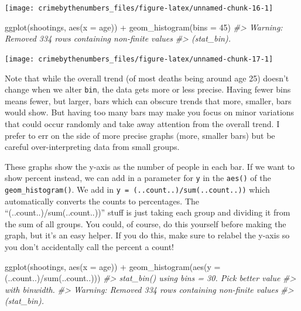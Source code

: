 \documentclass[
]{krantz}
\makeatletter
\newenvironment{Shaded}{\begin{snugshade}}{\end{snugshade}}
\newcommand{\AttributeTok}[1]{\textcolor[rgb]{0.61,0.61,0.61}{#1}}
\newcommand{\CommentTok}[1]{\textcolor[rgb]{0.37,0.37,0.37}{\textit{#1}}}
\newcommand{\DecValTok}[1]{\textcolor[rgb]{0.06,0.06,0.06}{#1}}
\newcommand{\FunctionTok}[1]{\textcolor[rgb]{0,0,0}{#1}}
\newcommand{\NormalTok}[1]{#1}
\newcommand{\SpecialCharTok}[1]{\textcolor[rgb]{0,0,0}{#1}}
\newenvironment{kframe}{%
\medskip{}
\setlength{\fboxsep}{.8em}
 \def\at@end@of@kframe{}%
 \ifinner\ifhmode%
  \def\at@end@of@kframe{\end{minipage}}%
  \begin{minipage}{\columnwidth}%
 \fi\fi%
 \def\FrameCommand##1{\hskip\@totalleftmargin \hskip-\fboxsep
 \colorbox{shadecolor}{##1}\hskip-\fboxsep
     \hskip-\linewidth \hskip-\@totalleftmargin \hskip\columnwidth}%
 \MakeFramed {\advance\hsize-\width
   \@totalleftmargin\z@ \linewidth\hsize
   \@setminipage}}%
 {\par\unskip\endMakeFramed%
 \at@end@of@kframe}
\renewenvironment{Shaded}{\begin{kframe}}{\end{kframe}}
\makeatother
\begin{document}
\begin{center}\texttt{[image: crimebythenumbers\_files/figure-latex/unnamed-chunk-16-1]} \end{center}

\begin{Shaded}
\begin{Highlighting}[]
\FunctionTok{ggplot}\NormalTok{(shootings, }\FunctionTok{aes}\NormalTok{(}\AttributeTok{x =}\NormalTok{ age)) }\SpecialCharTok{+} \FunctionTok{geom\_histogram}\NormalTok{(}\AttributeTok{bins =} \DecValTok{45}\NormalTok{)}
\CommentTok{\#\textgreater{} Warning: Removed 334 rows containing non{-}finite values}
\CommentTok{\#\textgreater{} (stat\_bin).}
\end{Highlighting}
\end{Shaded}

\begin{center}\texttt{[image: crimebythenumbers\_files/figure-latex/unnamed-chunk-17-1]} \end{center}

Note that while the overall trend (of most deaths being around age 25) doesn't change when we alter \texttt{bin}, the data gets more or less precise. Having fewer bins means fewer, but larger, bars which can obscure trends that more, smaller, bars would show. But having too many bars may make you focus on minor variations that could occur randomly and take away attention from the overall trend. I prefer to err on the side of more precise graphs (more, smaller bars) but be careful over-interpreting data from small groups.

These graphs show the y-axis as the number of people in each bar. If we want to show percent instead, we can add in a parameter for \texttt{y} in the \texttt{aes()} of the \texttt{geom\_histogram()}. We add in \texttt{y\ =\ (..count..)/sum(..count..))} which automatically converts the counts to percentages. The ``(..count..)/sum(..count..))'' stuff is just taking each group and dividing it from the sum of all groups. You could, of course, do this yourself before making the graph, but it's an easy helper. If you do this, make sure to relabel the y-axis so you don't accidentally call the percent a count!

\begin{Shaded}
\begin{Highlighting}[]
\FunctionTok{ggplot}\NormalTok{(shootings, }\FunctionTok{aes}\NormalTok{(}\AttributeTok{x =}\NormalTok{ age)) }\SpecialCharTok{+} \FunctionTok{geom\_histogram}\NormalTok{(}\FunctionTok{aes}\NormalTok{(}\AttributeTok{y =}\NormalTok{ (..count..)}\SpecialCharTok{/}\FunctionTok{sum}\NormalTok{(..count..)))}
\CommentTok{\#\textgreater{} \textasciigrave{}stat\_bin()\textasciigrave{} using \textasciigrave{}bins = 30\textasciigrave{}. Pick better value}
\CommentTok{\#\textgreater{} with \textasciigrave{}binwidth\textasciigrave{}.}
\CommentTok{\#\textgreater{} Warning: Removed 334 rows containing non{-}finite values}
\CommentTok{\#\textgreater{} (stat\_bin).}
\end{Highlighting}
\end{Shaded}
\end{document}
